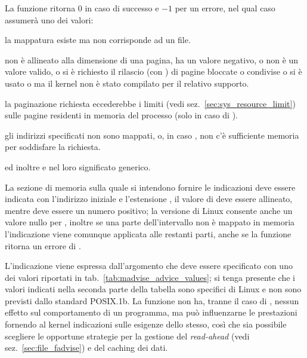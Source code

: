 \begin{funcproto}{
}

{La funzione ritorna $0$ in caso di successo e $-1$ per un errore, nel qual
  caso  assumerà uno dei valori: 
  \begin{errlist}
    \item[\errcode{EBADF}] la mappatura esiste ma non corrisponde ad un file.
    \item[\errcode{EINVAL}]  non è allineato alla dimensione di
      una pagina,  ha un valore negativo, o  non è
      un valore valido, o si è richiesto il rilascio (con
      ) di pagine bloccate o condivise o si è usato
       o  ma il kernel non è
      stato compilato per il relativo supporto.
    \item[\errcode{EIO}] la paginazione richiesta eccederebbe i limiti (vedi
      sez.~\ref{sec:sys_resource_limit}) sulle pagine residenti in memoria del
      processo (solo in caso di ).
    \item[\errcode{ENOMEM}] gli indirizzi specificati non sono mappati, o, in
      caso , non c'è sufficiente memoria per soddisfare
      la richiesta.
  \end{errlist}
  ed inoltre  e  nel loro significato generico.}
\end{funcproto}

La sezione di memoria sulla quale si intendono fornire le indicazioni deve
essere indicata con l'indirizzo iniziale  e l'estensione
, il valore di  deve essere allineato,
mentre  deve essere un numero positivo; la versione di Linux
consente anche un valore nullo per , inoltre se una parte
dell'intervallo non è mappato in memoria l'indicazione viene comunque
applicata alle restanti parti, anche se la funzione ritorna un errore di
.

L'indicazione viene espressa dall'argomento  che deve essere
specificato con uno dei valori riportati in
tab.~\ref{tab:madvise_advice_values}; si tenga presente che i valori indicati
nella seconda parte della tabella sono specifici di Linux e non sono previsti
dallo standard POSIX.1b.  La funzione non ha, tranne il caso di
, nessun effetto sul comportamento di un programma, ma
può influenzarne le prestazioni fornendo al kernel indicazioni sulle esigenze
dello stesso, così che sia possibile scegliere le opportune strategie per la
gestione del \textit{read-ahead} (vedi sez.~\ref{sec:file_fadvise}) e del
caching dei dati.

